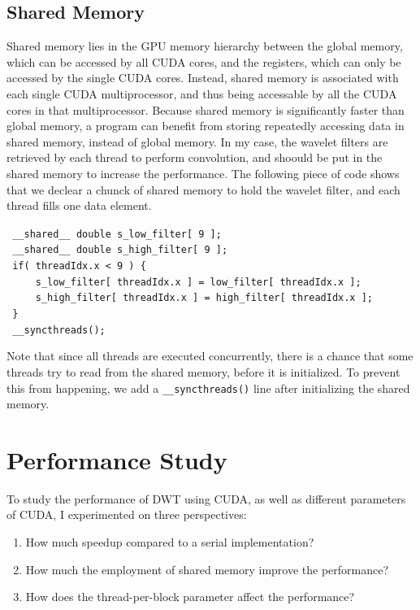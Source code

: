 \documentclass{article}
\begin{document}
\subsection{Shared Memory}
\label{sec:sharedM}
%
Shared memory lies in the GPU memory hierarchy between the global memory,
which can be accessed by all CUDA cores, and the registers, which can only 
be accessed by the single CUDA cores.
%
Instead, shared memory is associated with each single CUDA multiprocessor, 
and thus being accessable by all the CUDA cores in that multiprocessor.
%
Because shared memory is significantly faster than global memory,
a program can benefit from storing repeatedly accessing data in 
shared memory, instead of global memory.
%
In my case, the wavelet filters are retrieved by each thread to perform
convolution, and shoould be put in the shared memory to increase the performance.
%
The following piece of code shows that we declear a chunck of shared memory to hold
the wavelet filter, and each thread fills one data element.

\bigskip
\noindent \verb| __shared__ double s_low_filter[ 9 ]; | \\
\verb| __shared__ double s_high_filter[ 9 ]; |\\
\verb| if( threadIdx.x < 9 ) { |\\
\verb|     s_low_filter[ threadIdx.x ] = low_filter[ threadIdx.x ]; |\\
\verb|     s_high_filter[ threadIdx.x ] = high_filter[ threadIdx.x ]; |\\
\verb| } |\\
\verb| __syncthreads();|
\bigskip

Note that since all threads are executed concurrently, there is a chance that
some threads try to read from the shared memory, before it is initialized.
%
To prevent this from happening, we add a \verb|__syncthreads()| line after
initializing the shared memory.


\section{Performance Study}
\label{sec:performance}
%
To study the performance of DWT using CUDA, as well as different parameters
of CUDA, I experimented on three perspectives:
%
\begin{enumerate}
\item How much speedup compared to a serial implementation?
\item How much the employment of shared memory improve the  performance?
\item How does the thread-per-block parameter affect the performance?
\end{enumerate}
\end{document}
